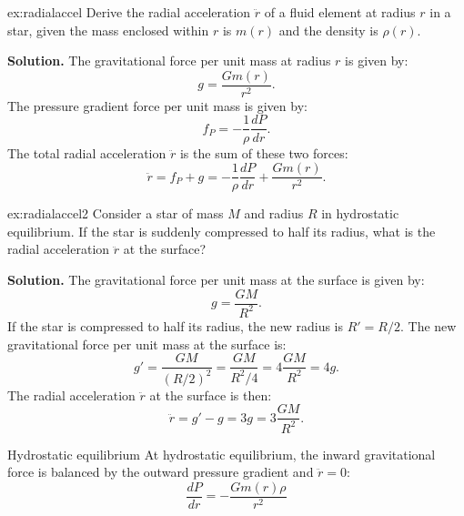 \begin{example}{}{ex:radialaccel}
Derive the radial acceleration $\ddot{r}$ of a fluid element at radius $r$ in a star, given the mass enclosed within $r$ is $m(r)$ and the density is $\rho(r)$.

\smallskip\textbf{Solution.}
The gravitational force per unit mass at radius $r$ is given by:
\begin{equation}
g = \frac{G m(r)}{r^2}.
\end{equation}
The pressure gradient force per unit mass is given by:
\begin{equation}
f_P = -\frac{1}{\rho} \frac{dP}{dr}.
\end{equation}
The total radial acceleration $\ddot{r}$ is the sum of these two forces:
\begin{equation}
\ddot{r} = f_P + g = -\frac{1}{\rho} \frac{dP}{dr} + \frac{G m(r)}{r^2}.
\end{equation}
\end{example}

\begin{example}{}{ex:radialaccel2}
Consider a star of mass $M$ and radius $R$ in hydrostatic equilibrium. If the star is suddenly compressed to half its radius, what is the radial acceleration $\ddot{r}$ at the surface?

\smallskip\textbf{Solution.}
The gravitational force per unit mass at the surface is given by:
\begin{equation}
g = \frac{GM}{R^2}.
\end{equation}
If the star is compressed to half its radius, the new radius is $R' = R/2$. The new gravitational force per unit mass at the surface is:
\begin{equation}
g' = \frac{GM}{(R/2)^2} = \frac{GM}{R^2/4} = 4\frac{GM}{R^2} = 4g.
\end{equation}
The radial acceleration $\ddot{r}$ at the surface is then:
\begin{equation}
\ddot{r} = g' - g = 3g = 3\frac{GM}{R^2}.
\end{equation}
\end{example}

\begin{theory}{Hydrostatic equilibrium}
At hydrostatic equilibrium, the inward gravitational force is balanced by the outward pressure gradient and $\ddot{r}=0$:
\begin{equation}
    \frac{dP}{dr} = -\frac{G m(r) \rho}{r^2}    
\end{equation}
\end{theory}


